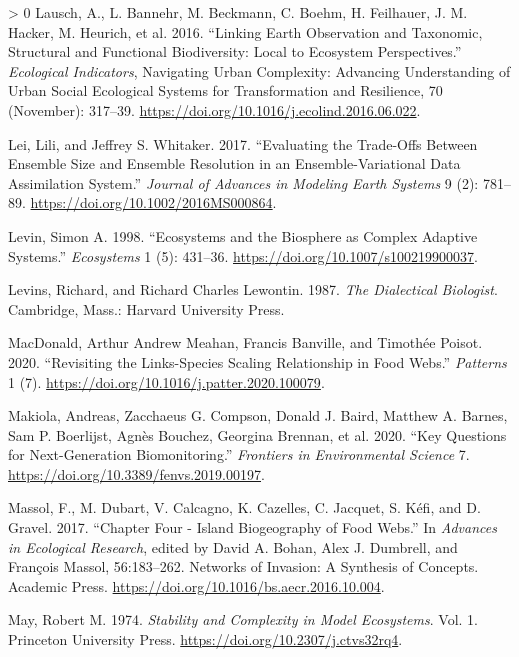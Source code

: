 \documentclass[11pt]{article}
\newlength{\cslhangindent}
\newenvironment{CSLReferences}[3] %
 {%
  \setlength{\parindent}{0pt}
  \ifodd #1 \everypar{\setlength{\hangindent}{\cslhangindent}}\ignorespaces\fi
  \ifnum #2 > 0
  \setlength{\parskip}{#2\baselineskip}
  \fi
 }%
 {}
\begin{document}
\begin{CSLReferences}{1}{0}
\leavevmode\hypertarget{ref-Lausch2016LinEar}{}%
Lausch, A., L. Bannehr, M. Beckmann, C. Boehm, H. Feilhauer, J. M.
Hacker, M. Heurich, et al. 2016. {``Linking Earth Observation and
Taxonomic, Structural and Functional Biodiversity: Local to Ecosystem
Perspectives.''} \emph{Ecological Indicators}, Navigating Urban
Complexity: Advancing Understanding of Urban Social Ecological Systems
for Transformation and Resilience, 70 (November): 317--39.
\url{https://doi.org/10.1016/j.ecolind.2016.06.022}.

\leavevmode\hypertarget{ref-Lei2017EvaTra}{}%
Lei, Lili, and Jeffrey S. Whitaker. 2017. {``Evaluating the Trade-Offs
Between Ensemble Size and Ensemble Resolution in an Ensemble-Variational
Data Assimilation System.''} \emph{Journal of Advances in Modeling Earth
Systems} 9 (2): 781--89. \url{https://doi.org/10.1002/2016MS000864}.

\leavevmode\hypertarget{ref-Levin1998EcoBio}{}%
Levin, Simon A. 1998. {``Ecosystems and the Biosphere as Complex
Adaptive Systems.''} \emph{Ecosystems} 1 (5): 431--36.
\url{https://doi.org/10.1007/s100219900037}.

\leavevmode\hypertarget{ref-Levins1987DiaBio}{}%
Levins, Richard, and Richard Charles Lewontin. 1987. \emph{The
Dialectical Biologist}. Cambridge, Mass.: Harvard University Press.

\leavevmode\hypertarget{ref-MacDonald2020RevLin}{}%
MacDonald, Arthur Andrew Meahan, Francis Banville, and Timothée Poisot.
2020. {``Revisiting the Links-Species Scaling Relationship in Food
Webs.''} \emph{Patterns} 1 (7).
\url{https://doi.org/10.1016/j.patter.2020.100079}.

\leavevmode\hypertarget{ref-Makiola2020KeyQue}{}%
Makiola, Andreas, Zacchaeus G. Compson, Donald J. Baird, Matthew A.
Barnes, Sam P. Boerlijst, Agnès Bouchez, Georgina Brennan, et al. 2020.
{``Key Questions for Next-Generation Biomonitoring.''} \emph{Frontiers
in Environmental Science} 7.
\url{https://doi.org/10.3389/fenvs.2019.00197}.

\leavevmode\hypertarget{ref-Massol2017ChaFou}{}%
Massol, F., M. Dubart, V. Calcagno, K. Cazelles, C. Jacquet, S. Kéfi,
and D. Gravel. 2017. {``Chapter Four - Island Biogeography of Food
Webs.''} In \emph{Advances in Ecological Research}, edited by David A.
Bohan, Alex J. Dumbrell, and François Massol, 56:183--262. Networks of
Invasion: A Synthesis of Concepts. Academic Press.
\url{https://doi.org/10.1016/bs.aecr.2016.10.004}.

\leavevmode\hypertarget{ref-May1974StaCom}{}%
May, Robert M. 1974. \emph{Stability and Complexity in Model
Ecosystems}. Vol. 1. Princeton University Press.
\url{https://doi.org/10.2307/j.ctvs32rq4}.


\end{CSLReferences}
\end{document}
